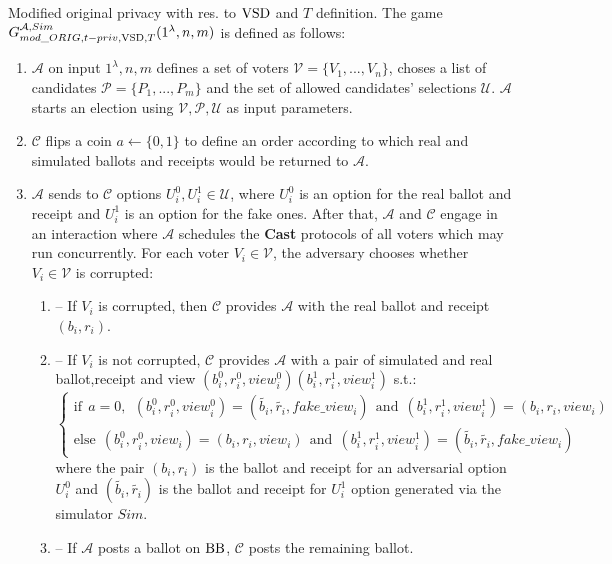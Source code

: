 \begin{definition}{ Modified original privacy with res. to $\operatorname{VSD}$ and $T$ definition.}
The game $G_{mod\_ORIG,t-priv, \operatorname{VSD},T}^{\mathcal{A},Sim}(1^{\lambda},n,m)$ is defined as follows:
\begin{enumerate} 
\item $\mathcal{A}$ on input $1^{\lambda},n,m$ defines a set of voters  $\mathcal{V} = \{V_1,...,V_n\}$, choses a list of candidates  $\mathcal{P} = \{P_1,...,P_m\}$ and the set of allowed candidates' selections $\mathcal{U}$.  $\mathcal{A}$ starts an election using $\mathcal{V}, \mathcal{P}, \mathcal{U}$ as input parameters.
\item $\mathcal{C}$ flips a coin $a \leftarrow \{0,1\}$ to define an order according to which real and simulated ballots and receipts would be returned to $\mathcal{A}$.
\item   $\mathcal{A}$ sends to  $\mathcal{C}$ options $U_i^0, U_i^1 \in  \mathcal{U}$, where $U_i^0$ is an option for the real ballot and receipt and $U_i^1$ is an option for the fake ones.  After that, $\mathcal{A}$ and $\mathcal{C}$ engage in an interaction where $\mathcal{A}$ schedules the \textbf{Cast}   protocols of all voters which may run concurrently. For each voter $V_i \in \mathcal{V}$, the adversary chooses whether $V_i \in \mathcal{V}$ is corrupted: 
\begin{enumerate}
\item[] -- If $V_i$ is corrupted, then $\mathcal{C}$ provides $\mathcal{A}$ with the real ballot and receipt $(b_i,r_i)$.
\item[] --  If $V_i$ is not corrupted, $\mathcal{C}$  provides $\mathcal{A}$ with a pair of simulated and real ballot,receipt and view $(b_i^0, r_i^0,view_i^0) (b_i^1, r_i^1,view_i^1)$ s.t.:\\
$ \begin{cases}
 \text{if} ~~a =0,~~ (b_i^0,r_i^0,view_i^0) = (\tilde{b_i},\tilde{r_i},fake\_view_i) ~~ \text{and} ~~  (b_i^1,r_i^1,view_i^1) = (b_i,r_i,view_i)   \\ 
 \text{else}~~ (b_i^0,r_i^0,view_i) =(b_i,r_i,view_i)~~  \text{and} ~~  (b_i^1,r_i^1,view_i^1) =(\tilde{b_i},\tilde{r_i},fake\_view_i)
\end{cases}$\\ 
where the pair $(b_i, r_i)$ is the ballot and receipt for an adversarial option $U_i^0$ and $(\tilde{b_i},\tilde{r_i})$ is the ballot and receipt for  $U_i^1$ option generated via the simulator $Sim$.
\item[] --  If  $\mathcal{A}$ posts a ballot on $\operatorname{BB}$, $\mathcal{C}$ posts the remaining ballot. 

\end{enumerate}
\end{enumerate}
\end{definition}
